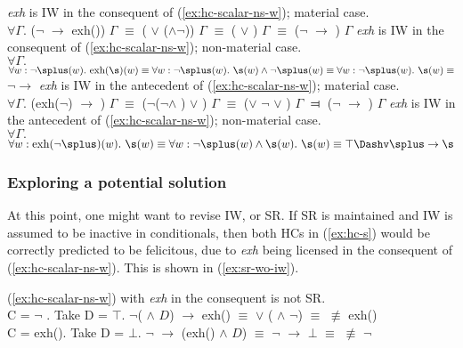 	\begin{exe}
		\ex\label{ex:hc-s-ns-w-iw}
		\begin{xlist}
			\ex\textit{exh} is IW in the consequent of (\ref{ex:hc-scalar-ns-w}); material case.\\ $\forall \Gamma.$ ($\neg$\splus{} $\rightarrow$ exh(\s)) $\Gamma$ $\equiv$ (\splus{} $\vee$ (\s$\wedge$$\neg$\splus)) $\Gamma$ $\equiv$ (\splus{} $\vee$ \s) $\Gamma$ $\equiv$ ($\neg$\splus{} $\rightarrow$ \s) $\Gamma$
			\ex\textit{exh} is IW in the consequent of (\ref{ex:hc-scalar-ns-w}); non-material case.\\ $\forall \Gamma.$ $\forall w: \neg\splus(w). \ \text{exh}(\s)(w) \equiv \forall w: \neg\splus(w). \ \s(w) \wedge \neg \splus(w) \equiv \forall w: \neg\splus(w). \ \s(w) \equiv$ $\neg$\splus $\rightarrow$ \s
			\ex\textit{exh} is IW in the antecedent of (\ref{ex:hc-scalar-ns-w}); material case.\\
			$\forall \Gamma.$ (exh($\neg$\splus) $\rightarrow$ \s{}) $\Gamma$ $\equiv$ ($\neg$($\neg$\splus $\wedge$ \s) $\vee$ \s{}) $\Gamma$ $\equiv$ (\splus $\vee$ $\neg$\s{} $\vee$ \s) $\Gamma$ $\Dashv$ ($\neg$\splus{} $\rightarrow$ \s) $\Gamma$
			\ex\textit{exh} is IW in the antecedent of (\ref{ex:hc-scalar-ns-w}); non-material case.\\$\forall \Gamma.$ $\forall w: \text{exh}(\neg\splus)(w). \ \s(w) \equiv \forall w: \neg\splus(w) \wedge \s(w). \ \s(w) \equiv \top \Dashv \splus \rightarrow \s$
		\end{xlist}
	\end{exe}

	\subsubsection{Exploring a potential solution}\label{sec:sr-iw-tentative-solution}
	At this point, one might want to revise IW, or SR. If SR is maintained and IW is assumed to be inactive in conditionals, then both HCs in (\ref{ex:hc-s}) would be correctly predicted to be felicitous, due to \textit{exh} being licensed in the consequent of (\ref{ex:hc-scalar-ns-w}). This is shown in (\ref{ex:sr-wo-iw}).
	
	\begin{exe}
		\ex\label{ex:sr-wo-iw} {(\ref{ex:hc-scalar-ns-w}) with \textit{exh} in the consequent is not SR.\\
		C = $\neg$ \splus. Take D = $\top$. $\neg$(\splus{} $\wedge$ $D$) $\rightarrow$ exh(\s) $\equiv$ \splus{} $\vee$ (\s{} $\wedge$ $\neg$\splus) $\equiv$ \s{} $\not\equiv$ exh(\s)\\
		C = exh(\s). Take D = $\bot$. $\neg$\splus{} $\rightarrow$ (exh(\s) $\wedge$ $D$) $\equiv$ $\neg$\splus{} $\rightarrow$ $\bot$ $\equiv$ \splus{} $\not\equiv$ $\neg$\splus}
	\end{exe}
	
